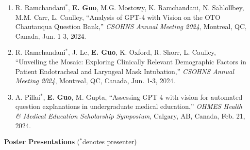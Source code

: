 \documentclass{article}
\begin{document}
\begin{enumerate}
    \item R. Ramchandani$^*$, \textbf{E. Guo}, M.G. Mostowy, K. Ramchandani, N. Sahlollbey, M.M. Carr, L. Caulley, ``Analysis of GPT-4 with Vision on the OTO Chautauqua Question Bank,'' \textit{CSOHNS Annual Meeting 2024}, Montreal, QC, Canada, Jun. 1-3, 2024.
    \item R. Ramchandani$^*$, J. Le, \textbf{E. Guo}, K. Oxford, R. Shorr, L. Caulley, ``Unveiling the Mosaic: Exploring Clinically Relevant Demographic Factors in Patient Endotracheal and Laryngeal Mask Intubation,'' \textit{CSOHNS Annual Meeting 2024}, Montreal, QC, Canada, Jun. 1-3, 2024.
    \item A. Pillai$^*$, \textbf{E. Guo}, M. Gupta, ``Assessing GPT-4 with vision for automated question explanations in undergraduate medical education,'' \textit{OHMES Health \& Medical Education Scholarship Symposium}, Calgary, AB, Canada, Feb. 21, 2024.
\end{enumerate} \vspace{1em}

\textbf{Poster Presentations} ($^*$denotes presenter) \vspace{.5em}
\end{document}
